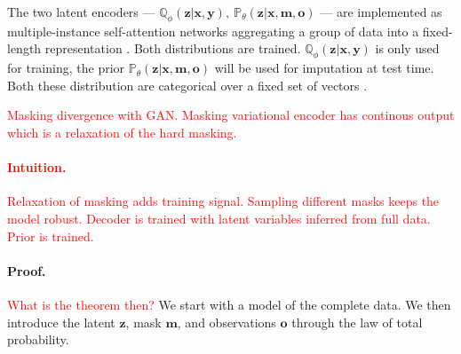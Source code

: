 \documentclass[a4paper,12pt,twoside,openright]{report}
\newcommand{\crit}[1]{\textcolor{red}{#1}}
\begin{document}
The two latent encoders --- $\mathbb{Q}_\phi (\mathbf{z} | \mathbf{x}, \mathbf{y}), ~ \mathbb{P}_\theta (\mathbf{z} | \mathbf{x}, \mathbf{m}, \mathbf{o})$ --- are implemented as multiple-instance self-attention networks aggregating a group of data into a fixed-length representation \parencite{ilseAttentionbasedDeepMultiple2018}. Both distributions are trained. $\mathbb{Q}_\phi (\mathbf{z} | \mathbf{x}, \mathbf{y})$ is only used for training, the prior $\mathbb{P}_\theta (\mathbf{z} | \mathbf{x}, \mathbf{m}, \mathbf{o})$ will be used for imputation at test time. Both these distribution are categorical over a fixed set of vectors \parencite{vandenoordNeuralDiscreteRepresentation2017}.

\crit{Masking divergence with GAN. Masking variational encoder has continous output which is a relaxation of the hard masking.}

\crit{\paragraph{Intuition.} Relaxation of masking adds training signal. Sampling different masks keeps the model robust. Decoder is trained with latent variables inferred from full data. Prior is trained.}

\paragraph{Proof.} \crit{What is the theorem then?} We start with a model of the complete data. We then introduce the latent $\mathbf{z}$, mask $\mathbf{m}$, and observations $\mathbf{o}$ through the law of total probability.
\end{document}

